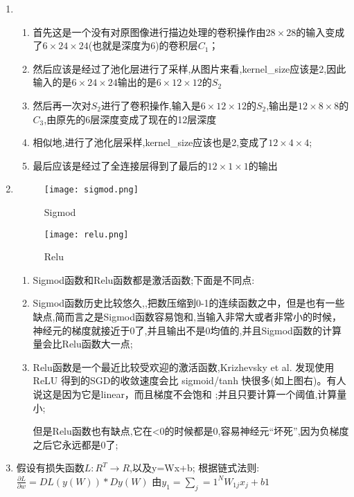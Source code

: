 \documentclass[11pt, a4paper, UTF8]{ctexart}
\begin{document}
\begin{solution}
	\begin{enumerate}
		\item \begin{enumerate}
			\item 首先这是一个没有对原图像进行描边处理的卷积操作由$28\times 28$的输入变成了$6\times 24\times 24$(也就是深度为6)的卷积层$C_1$；
			\item 然后应该是经过了池化层进行了采样,从图片来看,kernel\_size应该是2,因此输入的是$6\times 24\times 24$输出的是$6\times 12\times 12$的$S_2$
			\item 然后再一次对$S_2$进行了卷积操作,输入是$6\times 12\times 12$的$S_2$,输出是$12\times 8\times 8$的$C_3$,由原先的6层深度变成了现在的12层深度
			\item 相似地,进行了池化层采样,kernel\_size应该也是2,变成了$12\times 4 \times  4$;
			\item 最后应该是经过了全连接层得到了最后的$12\times 1\times 1$的输出
			
		\end{enumerate}
	\item 	 \begin{figure}[htbp] 
		\centering
		\texttt{[image: sigmod.png]}
		\caption{Sigmod}
	\end{figure} 
\begin{figure}[htbp] 
	\centering
	\texttt{[image: relu.png]}
	\caption{Relu}
\end{figure} 
	\begin{enumerate}
		\item Sigmod函数和Relu函数都是激活函数;下面是不同点:
		\item Sigmod函数历史比较悠久,,把数压缩到0-1的连续函数之中，但是也有一些缺点,简而言之是Sigmod函数容易饱和,当输入非常大或者非常小的时候，神经元的梯度就接近于0了,并且输出不是0均值的,并且Sigmod函数的计算量会比Relu函数大一点;
		\item Relu函数是一个最近比较受欢迎的激活函数,Krizhevsky et al. 发现使用 ReLU 得到的SGD的收敛速度会比 sigmoid/tanh 快很多(如上图右)。有人说这是因为它是linear，而且梯度不会饱和
		;并且只要计算一个阈值,计算量小;
		
		但是Relu函数也有缺点,它在<0的时候都是0,容易神经元“坏死”,因为负梯度之后它永远都是0了;
	\end{enumerate}


\item 假设有损失函数$L:R^T\rightarrow R$,以及y=Wx+b;
根据链式法则:$\frac{\partial L}{\partial w}=DL(y(W))*Dy(W)$
由$y_1=\sum _j=1^{N}W_{1j}x_j+b1$


\end{enumerate}
\end{solution}
\end{document}
